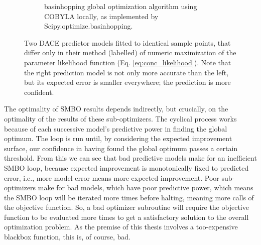 \begin{figure}
\begin{subfigure}[t]{0.5\textwidth}
                \caption{basinhopping\cite{} global optimization algorithm using COBYLA\cite{} locally, as implemented by Scipy\linebreak[0].optimize\linebreak[0].basinhopping.}
        \end{subfigure}
        \caption{Two DACE predictor models fitted to identical sample points, that differ only in their method (labelled) of numeric maximization of the parameter likelihood function (Eq. \ref{eq:conc_likelihood}). Note that the right prediction model is not only more accurate than the left, but its expected error is smaller everywhere; the prediction is more confident.}\label{fig:opt_compare}
\end{figure}

The optimality of SMBO results depends indirectly, but crucially, on the optimality of the results of these sub-optimizers. The cyclical process works because of each successive model's predictive power in finding the global optimum. The loop is run until, by considering the expected improvement surface, our confidence in having found the global optimum passes a certain threshold. From this we can see that bad predictive models make for an inefficient SMBO loop, because expected improvement is monotonically fixed to predicted error, i.e., more model error means more expected improvement. Poor sub-optimizers make for bad models, which have poor predictive power, which means the SMBO loop will be iterated more times before halting, meaning more calls of the objective function. So, a bad optimizer subroutine will require the objective function to be evaluated more times to get a satisfactory solution to the overall optimization problem. As the premise of this thesis involves a too-expensive blackbox function, this is, of course, bad.

%




